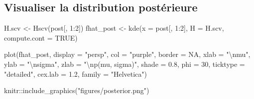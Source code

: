 \documentclass[
  a4paper,11pt,twoside,onecolumn,openright,final,oldfontcommands]{memoir}
\newenvironment{Shaded}{\begin{snugshade}}{\end{snugshade}}
\newcommand{\AttributeTok}[1]{\textcolor[rgb]{0.77,0.63,0.00}{#1}}
\newcommand{\ConstantTok}[1]{\textcolor[rgb]{0.00,0.00,0.00}{#1}}
\newcommand{\DecValTok}[1]{\textcolor[rgb]{0.00,0.00,0.81}{#1}}
\newcommand{\FloatTok}[1]{\textcolor[rgb]{0.00,0.00,0.81}{#1}}
\newcommand{\FunctionTok}[1]{\textcolor[rgb]{0.00,0.00,0.00}{#1}}
\newcommand{\NormalTok}[1]{#1}
\newcommand{\OtherTok}[1]{\textcolor[rgb]{0.56,0.35,0.01}{#1}}
\newcommand{\SpecialCharTok}[1]{\textcolor[rgb]{0.00,0.00,0.00}{#1}}
\newcommand{\StringTok}[1]{\textcolor[rgb]{0.31,0.60,0.02}{#1}}
\theoremstyle{definition}
\theoremstyle{definition}
\theoremstyle{definition}
\theoremstyle{definition}
\theoremstyle{remark}
\begin{document}
\hypertarget{visualiser-la-distribution-postuxe9rieure}{%
\subsection{Visualiser la distribution postérieure}\label{visualiser-la-distribution-postuxe9rieure}}

\begin{Shaded}
\begin{Highlighting}[]
\NormalTok{H.scv }\OtherTok{\textless{}{-}} \FunctionTok{Hscv}\NormalTok{(post[, }\DecValTok{1}\SpecialCharTok{:}\DecValTok{2}\NormalTok{])}
\NormalTok{fhat\_post }\OtherTok{\textless{}{-}} \FunctionTok{kde}\NormalTok{(}\AttributeTok{x =}\NormalTok{ post[, }\DecValTok{1}\SpecialCharTok{:}\DecValTok{2}\NormalTok{], }\AttributeTok{H =}\NormalTok{ H.scv, }\AttributeTok{compute.cont =} \ConstantTok{TRUE}\NormalTok{)}

\FunctionTok{plot}\NormalTok{(fhat\_post, }\AttributeTok{display =} \StringTok{"persp"}\NormalTok{, }\AttributeTok{col =} \StringTok{"purple"}\NormalTok{, }\AttributeTok{border =} \ConstantTok{NA}\NormalTok{,}
  \AttributeTok{xlab =} \StringTok{"}\SpecialCharTok{\textbackslash{}n}\StringTok{mu"}\NormalTok{, }\AttributeTok{ylab =} \StringTok{"}\SpecialCharTok{\textbackslash{}n}\StringTok{sigma"}\NormalTok{, }\AttributeTok{zlab =} \StringTok{"}\SpecialCharTok{\textbackslash{}n}\StringTok{p(mu, sigma)"}\NormalTok{,}
  \AttributeTok{shade =} \FloatTok{0.8}\NormalTok{, }\AttributeTok{phi =} \DecValTok{30}\NormalTok{, }\AttributeTok{ticktype =} \StringTok{"detailed"}\NormalTok{,}
  \AttributeTok{cex.lab =} \FloatTok{1.2}\NormalTok{, }\AttributeTok{family =} \StringTok{"Helvetica"}\NormalTok{)}
\end{Highlighting}
\end{Shaded}

\begin{Shaded}
\begin{Highlighting}[]
\NormalTok{knitr}\SpecialCharTok{::}\FunctionTok{include\_graphics}\NormalTok{(}\StringTok{"figures/posterior.png"}\NormalTok{)}
\end{Highlighting}
\end{Shaded}
\end{document}
